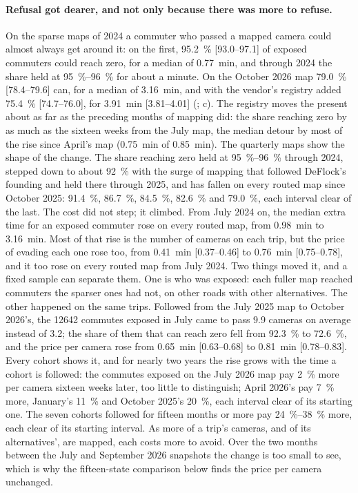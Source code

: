 \documentclass[11pt,twoside]{article}
\begin{document}
\paragraph{Refusal got dearer, and not only because there was more to refuse.} On the
sparse maps of 2024 a commuter who passed a mapped camera could almost always get around it:
on the first, \SI{95.2}{\percent} [93.0--97.1] of exposed commuters could reach zero, for a
median of \SI{0.77}{\minute}, and through 2024 the share held at \SIrange{95}{96}{\percent}
for about a minute. On the October 2026 map \SI{79.0}{\percent} [78.4--79.6] can, for a
median of \SI{3.16}{\minute}, and with the vendor's registry added \SI{75.4}{\percent}
[74.7--76.0], for \SI{3.91}{\minute} [3.81--4.01] (; c). The
registry moves the present about as far as the preceding months of mapping did: the share
reaching zero by as much as the sixteen weeks from the July map, the median detour by most of
the rise since April's map (\SI{0.75}{\minute} of \SI{0.85}{\minute}). The quarterly maps show
the shape of the change. The share reaching zero held at \SIrange{95}{96}{\percent} through
2024, stepped down to about \SI{92}{\percent} with the surge of mapping that followed
DeFlock's founding and held there through 2025, and has fallen on every routed map since
October 2025: \SI{91.4}{\percent}, \SI{86.7}{\percent}, \SI{84.5}{\percent},
\SI{82.6}{\percent} and \SI{79.0}{\percent}, each interval clear of the last.
The cost did not step; it climbed. From July 2024 on, the median extra time for an exposed
commuter rose on every routed map, from \SI{0.98}{\minute} to \SI{3.16}{\minute}. Most of
that rise is the number of cameras on each trip, but the price of evading each one rose too,
from \SI{0.41}{\minute} [0.37--0.46] to \SI{0.76}{\minute} [0.75--0.78], and it too rose on
every routed map from July 2024. Two things moved it, and a fixed sample can separate them.
One is who was exposed: each fuller map reached commuters the sparser ones had not, on other
roads with other alternatives. The other happened on the same trips. Followed from the July 2025 map to October
2026's, the \num{12642} commutes exposed in July came to pass \num{9.9} cameras on average
instead of \num{3.2}; the share of them that can reach zero fell from \SI{92.3}{\percent} to
\SI{72.6}{\percent}, and the price per camera rose from \SI{0.65}{\minute} [0.63--0.68] to
\SI{0.81}{\minute} [0.78--0.83]. Every cohort shows it, and for nearly two years the rise grows
with the time a cohort is followed: the commutes exposed on the July 2026 map pay
\SI{2}{\percent} more per camera sixteen weeks later, too little to distinguish; April 2026's
pay \SI{7}{\percent} more, January's \SI{11}{\percent} and October 2025's \SI{20}{\percent},
each interval clear of its starting one. The seven cohorts followed for fifteen months or
more pay \SIrange{24}{38}{\percent} more, each clear of its starting interval. As more of a trip's cameras, and of its
alternatives', are mapped, each costs more to avoid. Over the two months between the July and September
2026 snapshots the change is too small to see, which is why the fifteen-state comparison below
finds the price per camera unchanged.
\end{document}
